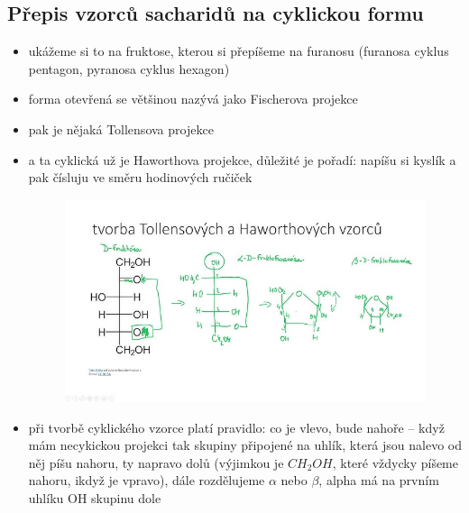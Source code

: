 \documentclass{article}
\begin{document}
\subsection{Přepis vzorců sacharidů na cyklickou formu}
\begin{itemize}
  \item ukážeme si to na fruktose, kterou si přepíšeme na furanosu (furanosa cyklus pentagon, pyranosa cyklus hexagon)
  \item forma otevřená se většinou nazývá jako Fischerova projekce
  \item pak je nějaká Tollensova projekce
  \item a ta cyklická už je Haworthova projekce, důležité je pořadí: napíšu si kyslík a pak čísluju ve směru hodinových ručiček
  \begin{figure}[h]
      \includegraphics[width=\linewidth]{glukosa.png}
      \caption{}
  \end{figure}
  \item při tvorbě cyklického vzorce platí pravidlo: co je vlevo, bude nahoře -- když mám necykickou projekci tak skupiny připojené na uhlík, která jsou nalevo od něj píšu nahoru, ty napravo dolů (výjimkou je $CH_2OH$, které vždycky píšeme nahoru, ikdyž je vpravo), dále rozdělujeme $\alpha$ nebo $\beta$, alpha má na prvním uhlíku OH skupinu dole
\end{itemize}
\end{document}
